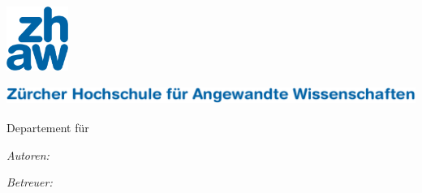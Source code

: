 

\begin{titlepage}

\setlength{\parskip}{0pt}

\begin{center}
\includegraphics[width=0.15\textwidth]{Figures/zhaw_rgb}

\ifxetex
    \vspace{0.6cm}
    {\zhawtitlefont\color{zhawblue}\LARGE \univname\par}   %
    \vspace{0.2cm}
\else
    \vspace{0.87cm}
    {\includegraphics[height=17.9pt]{Figures/zhaw_font_deu_font}\par}
    \vspace{0.05cm}
\fi
{\Large Departement für \deptname\par}                      %
\vspace{0.2cm}
{\Large \instname\par}                                 %
\vspace{3.5cm}                            
\textsc{\Large \ttype}                                 %
\vspace{0.2cm}
\HRule 
\vspace{0.4cm}
{\huge \bfseries \ttitle\par}                          %
\vspace{0.4cm}  
\HRule
\vspace{1.5cm}

 
\begin{minipage}[t]{0.4\textwidth}
\begin{flushleft} 
    \large
    \emph{Autoren:}\\
    \authorname
\end{flushleft}
\end{minipage}
\begin{minipage}[t]{0.4\textwidth}
\begin{flushright} 
    \large
    \emph{Betreuer:} \\
    \supnameA \\
    \supnameB
\end{flushright}
\end{minipage}
\vspace{2cm}
 

\end{center}
\end{titlepage}
